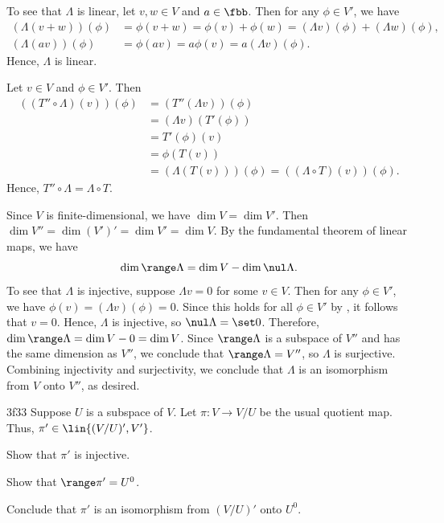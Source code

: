 \begin{solenum}
    \item To see that $\Lambda$ is linear, let $v, w \in V$ and $a \in \fbb$.
	Then for any $\phi \in V'$, we have
    \begin{align*}
        (\Lambda(v + w))(\phi) &= \phi(v + w) = \phi(v) + \phi(w) = (\Lambda v)(\phi) + (\Lambda w)(\phi),\\
        (\Lambda(av))(\phi) &= \phi(av) = a \phi(v) = a (\Lambda v)(\phi).
    \end{align*}
    Hence, $\Lambda$ is linear.
    \item Let $v \in V$ and $\phi \in V'$.
	Then
    \begin{align*}
        ((T'' \circ \Lambda)(v))(\phi) &= (T''(\Lambda v))(\phi) \\
        &= (\Lambda v)(T'(\phi)) \\
        &= T'(\phi)(v) \\
        &= \phi(T(v)) \\
        &= (\Lambda(T(v)))(\phi) = ((\Lambda \circ T)(v))(\phi).
    \end{align*}
    Hence, $T'' \circ \Lambda = \Lambda \circ T$.
    \item Since $V$ is finite-dimensional, we have $\dim V = \dim V'$.
	Then $\dim V'' = \dim (V')' = \dim V' = \dim V$.
	By the fundamental theorem of linear maps, we have
    \[
    	\dim \range \Lambda = \dim V - \dim \nul \Lambda.
    \]
    To see that $\Lambda$ is injective, suppose $\Lambda v = 0$ for some $v \in V$.
	Then for any $\phi \in V'$, we have $\phi(v) = (\Lambda v)(\phi) = 0$.
	Since this holds for all $\phi \in V'$ by , it follows that $v = 0$.
	Hence, $\Lambda$ is injective, so $\nul \Lambda = \set 0$.
	Therefore, $\dim \range \Lambda = \dim V - 0 = \dim V$.
	Since $\range \Lambda$ is a subspace of $V''$ and has the same dimension as $V''$, we conclude that $\range \Lambda = V''$, so $\Lambda$ is surjective.
	Combining injectivity and surjectivity, we conclude that $\Lambda$ is an isomorphism from $V$ onto $V''$, as desired.
\end{solenum}

\begin{exercise}{3f33}
    Suppose $U$ is a subspace of $V$.
	Let $\pi: V \to V / U$ be the usual quotient map.
	Thus, $\pi' \in \lin{(V / U)', V'}$.
    \begin{subexercises}
        \item Show that $\pi'$ is injective.
        \item Show that $\range \pi' = U^0$.
        \item Conclude that $\pi'$ is an isomorphism from $(V / U)'$ onto $U^0$.
    \end{subexercises}
\end{exercise}

